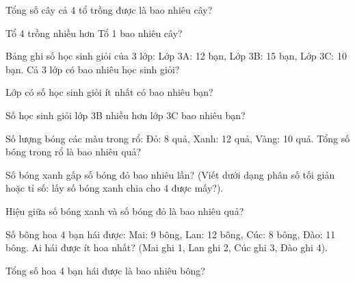 \begin{ex}
Tổng số cây cả 4 tổ trồng được là bao nhiêu cây?
\end{ex}

\begin{ex}
Tổ 4 trồng nhiều hơn Tổ 1 bao nhiêu cây?
\end{ex}

\begin{ex}
Bảng ghi số học sinh giỏi của 3 lớp: Lớp 3A: 12 bạn, Lớp 3B: 15 bạn, Lớp 3C: 10 bạn. Cả 3 lớp có bao nhiêu học sinh giỏi?
\end{ex}

\begin{ex}
Lớp có số học sinh giỏi ít nhất có bao nhiêu bạn?
\end{ex}

\begin{ex}
Số học sinh giỏi lớp 3B nhiều hơn lớp 3C bao nhiêu bạn?
\end{ex}

\begin{ex}
Số lượng bóng các màu trong rổ: Đỏ: 8 quả, Xanh: 12 quả, Vàng: 10 quả. Tổng số bóng trong rổ là bao nhiêu quả?
\end{ex}

\begin{ex}
Số bóng xanh gấp số bóng đỏ bao nhiêu lần? (Viết dưới dạng phân số tối giản hoặc tỉ số: lấy số bóng xanh chia cho 4 được mấy?).
\end{ex}

\begin{ex}
Hiệu giữa số bóng xanh và số bóng đỏ là bao nhiêu quả?
\end{ex}

\begin{ex}
Số bông hoa 4 bạn hái được: Mai: 9 bông, Lan: 12 bông, Cúc: 8 bông, Đào: 11 bông. Ai hái được ít hoa nhất? (Mai ghi 1, Lan ghi 2, Cúc ghi 3, Đào ghi 4).
\end{ex}

\begin{ex}
Tổng số hoa 4 bạn hái được là bao nhiêu bông?
\end{ex}

